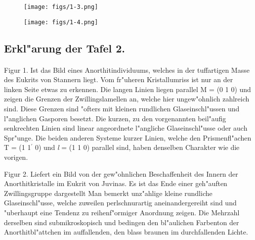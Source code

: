 \documentclass[a4paper, 11pt, oneside, polutonikogreek, german]{article}
\begin{document}
\vspace*{\fill}
\begin{figure}[H]
\centering
\texttt{[image: figs/1-3.png]}
\caption{}
\end{figure}
\vspace*{\fill}
\clearpage

\vspace*{\fill}
\begin{figure}[H]
\centering
\texttt{[image: figs/1-4.png]}
\caption{}
\end{figure}
\vspace*{\fill}
\clearpage
{}
\subsection{Erkl"arung der Tafel 2.}
\paragraph{}
Figur 1. Ist das Bild eines Anorthitindividuums, welches in der tuffartigen Masse des Eukrits von Stannern liegt. Vom fr"uheren Kristallumriss ist nur an der linken Seite etwas zu erkennen. Die langen Linien liegen parallel M = (0 1 0) und zeigen die Grenzen der Zwillingslamellen an, welche hier ungew"ohnlich zahlreich sind. Diese Grenzen sind "ofters mit kleinen rundlichen Glaseinschl"ussen und l"anglichen Gasporen besetzt. Die kurzen, zu den vorgenannten beil"aufig senkrechten Linien sind linear angeordnete l"angliche Glaseinschl"usse oder auch Spr"unge. Die beiden anderen Systeme kurzer Linien, welche den Prismenfl"achen T = (1 1$^{\prime}$ 0) und \emph{l} = (1 1 0) parallel sind, haben denselben Charakter wie die vorigen.

Figur 2. Liefert ein Bild von der gew"ohnlichen Beschaffenheit des Innern der Anorthitkristalle im Eukrit von Juvinas. Es ist das Ende einer geh"auften Zwillingsgruppe dargestellt Man bemerkt unz"ahlige kleine rundliche Glaseinschl"usse, welche zuweilen perlschnurartig aneinandergereiht sind und "uberhaupt eine Tendenz zu reihenf"ormiger Anordnung zeigen. Die Mehrzahl derselben sind submikroskopisch und bedingen den bl"aulichen Farbenton der Anorthitbl"attchen im auffallenden, den blass braunen im durchfallenden Lichte.
\end{document}
